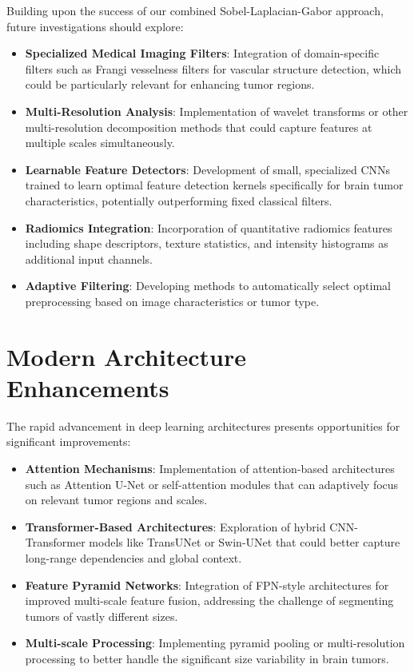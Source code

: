 Building upon the success of our combined Sobel-Laplacian-Gabor approach, future investigations should explore:

\begin{itemize}
    \item \textbf{Specialized Medical Imaging Filters}: Integration of domain-specific filters such as Frangi vesselness filters for vascular structure detection, which could be particularly relevant for enhancing tumor regions.
    
    \item \textbf{Multi-Resolution Analysis}: Implementation of wavelet transforms or other multi-resolution decomposition methods that could capture features at multiple scales simultaneously.
    
    \item \textbf{Learnable Feature Detectors}: Development of small, specialized CNNs trained to learn optimal feature detection kernels specifically for brain tumor characteristics, potentially outperforming fixed classical filters.
    
    \item \textbf{Radiomics Integration}: Incorporation of quantitative radiomics features including shape descriptors, texture statistics, and intensity histograms as additional input channels.
    
    \item \textbf{Adaptive Filtering}: Developing methods to automatically select optimal preprocessing based on image characteristics or tumor type.
\end{itemize}

\section{Modern Architecture Enhancements}

The rapid advancement in deep learning architectures presents opportunities for significant improvements:

\begin{itemize}
    \item \textbf{Attention Mechanisms}: Implementation of attention-based architectures such as Attention U-Net or self-attention modules that can adaptively focus on relevant tumor regions and scales.
    
    \item \textbf{Transformer-Based Architectures}: Exploration of hybrid CNN-Transformer models like TransUNet or Swin-UNet that could better capture long-range dependencies and global context.
    
    \item \textbf{Feature Pyramid Networks}: Integration of FPN-style architectures for improved multi-scale feature fusion, addressing the challenge of segmenting tumors of vastly different sizes.
    
    \item \textbf{Multi-scale Processing}: Implementing pyramid pooling or multi-resolution processing to better handle the significant size variability in brain tumors.
\end{itemize}

